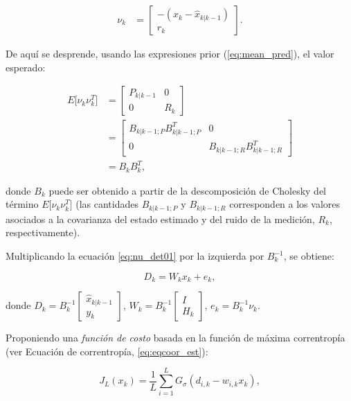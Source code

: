 \begin{align}
\nu_k &= \begin{bmatrix}
-(x_k - \hat{x}_{k|k-1})\\
r_k
\end{bmatrix} .
\label{eq:nu_det02}
\end{align}

De aqu\'i se desprende, usando las expresiones prior (\ref{eq:mean_pred}), el valor esperado:

\begin{align}
E \lbrack \nu_k \nu_k^T \rbrack &= \begin{bmatrix}
P_{k|k-1} & 0 \\
0 & R_k
\end{bmatrix}\\
&= \begin{bmatrix}
B_{k|k-1; P}B_{k|k-1; P}^T & 0\\
0 &  B_{k|k-1; R}B_{k|k-1; R}^T
\end{bmatrix}\\
& = B_kB_k^T,
\end{align}

donde $B_k$ puede ser obtenido a partir de la descomposici\'on de Cholesky del t\'ermino $E \lbrack \nu_k \nu_k^T \rbrack$ (las cantidades $B_{k|k-1; P}$ y $B_{k|k-1; R}$ corresponden a los valores asociados a la covarianza del estado estimado y del ruido de la medici\'on, $R_k$, respectivamente).
\bigskip

Multiplicando la ecuaci\'on \ref{eq:nu_det01} por la izquierda por $B_k^{-1}$, se obtiene:

\begin{equation}
D_k = W_k x_k + e_k,
\label{eq:D}
\end{equation}

donde $D_k = B^{-1}_k \begin{bmatrix}
\hat{x}_{k|k-1}\\ y_k
\end{bmatrix}$, $W_k = B^{-1}_k \begin{bmatrix}
I\\ H_k
\end{bmatrix}$, $e_k = B^{-1}_k \nu_k$.  
\bigskip

Proponiendo una \textit{funci\'on de costo} basada en la funci\'on de m\'axima correntrop\'ia (ver Ecuaci\'on de correntrop\'ia, \ref{eq:eqcoor_est}):

\begin{equation}
J_{L}(x_k) = \dfrac{1}{L} \sum_{i=1}^L G_{\sigma} (d_{i,k} - w_{i,k}x_k),
\label{eq:costo}
\end{equation}

